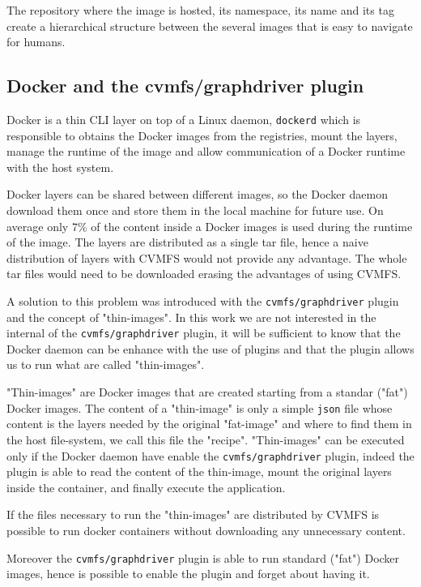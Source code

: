 The repository where the image is hosted, its namespace, its name and its tag
create a hierarchical structure between the several images that is easy to
navigate for humans.

\subsection{Docker and the cvmfs/graphdriver plugin}
\label{subsec:docker-thin-images}

Docker is a thin CLI layer on top of a Linux daemon, \texttt{dockerd} which is
responsible to obtains the Docker images from the registries, mount the layers,
manage the runtime of the image and allow communication of a Docker runtime
with the host system.

Docker layers can be shared between different images, so the Docker daemon
download them once and store them in the local machine for future use. On
average only 7\% of the content inside a Docker images is used during the
runtime of the image. The layers are distributed as a single tar file, hence a
naive distribution of layers with CVMFS would not provide any advantage. The
whole tar files would need to be downloaded erasing the advantages of using
CVMFS.

A solution to this problem was introduced with the \texttt{cvmfs/graphdriver}
plugin and the concept of "thin-images". In this work we are not interested in
the internal of the \texttt{cvmfs/graphdriver} plugin, it will be sufficient to
know that the Docker daemon can be enhance with the use of plugins and that the
plugin allows us to run what are called "thin-images".

"Thin-images" are Docker images that are created starting from a standar
("fat") Docker images. The content of a "thin-image" is only a simple
\texttt{json} file whose content is the layers needed by the original
"fat-image" and where to find them in the host file-system, we call this file
the "recipe". "Thin-images" can be executed only if the Docker daemon have
enable the \texttt{cvmfs/graphdriver} plugin, indeed the plugin is able to read
the content of the thin-image, mount the original layers inside the container,
and finally execute the application.

If the files necessary to run the "thin-images" are distributed by CVMFS is
possible to run docker containers without downloading any unnecessary content.

Moreover the \texttt{cvmfs/graphdriver} plugin is able to run standard ("fat") Docker images, hence is possible to enable the plugin and forget about having it. 

